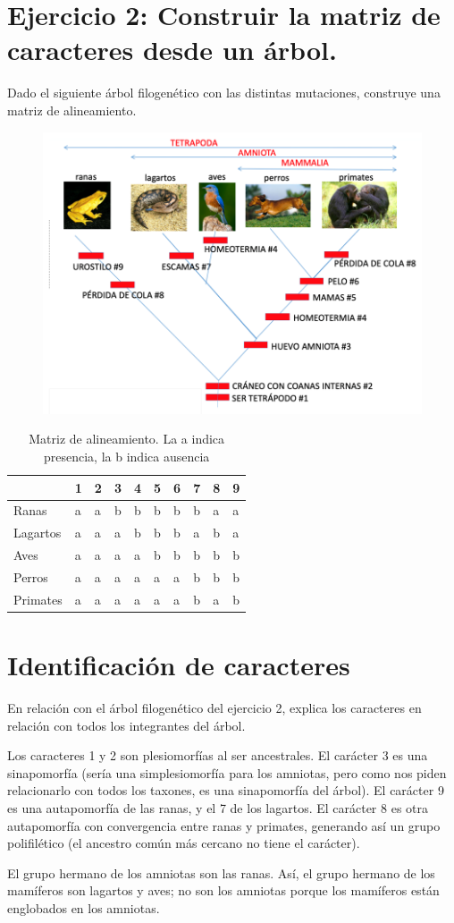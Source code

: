 \section{Ejercicio 2: Construir la matriz de caracteres desde un árbol.}
Dado el siguiente árbol filogenético con las distintas mutaciones, construye una matriz de alineamiento.
\begin{figure}[htbp]
\centering
\includegraphics[width=0.7\linewidth]{figs/ejercicio-2.png}
\end{figure}

\begin{table}[htbp]
\centering
\begin{tabular}{l | l l l l l l l l l }
\hline
& 1 & 2 & 3 & 4 & 5 & 6 & 7 & 8 & 9 \\
\hline
Ranas & a & a & b & b & b & b & b & a & a\\
Lagartos & a & a & a & b & b & b & a & b & a\\
Aves & a & a & a & a & b & b & b & b & b\\
Perros & a & a & a & a & a & a & b & b & b\\
Primates & a & a & a & a & a & a & b & a & b
\end{tabular}
\caption{Matriz de alineamiento. La a indica presencia, la b indica ausencia}
\end{table}

\section{Identificación de caracteres}
En relación con el árbol filogenético del ejercicio 2, explica los caracteres en relación con todos los integrantes del árbol.

Los caracteres 1 y 2 son plesiomorfías al ser ancestrales. El carácter 3 es una sinapomorfía (sería una simplesiomorfía para los amniotas, pero como nos piden relacionarlo con todos los taxones, es una sinapomorfía del árbol). El carácter 9 es una autapomorfía de las ranas, y el 7 de los lagartos. El carácter 8 es otra autapomorfía con convergencia entre ranas y primates, generando así un grupo polifilético (el ancestro común más cercano no tiene el carácter). 

El grupo hermano de los amniotas son las ranas. Así, el grupo hermano de los mamíferos son lagartos y aves; no son los amniotas porque los mamíferos están englobados en los amniotas.  